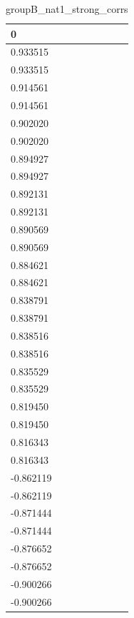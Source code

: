 \begin{table}
\caption{groupB_nat1_strong_corrs}
\label{tab:groupB_nat1_strong_corrs}
\begin{tabular}{lcr}
\toprule
0 \\
\midrule
0.933515 \\
0.933515 \\
0.914561 \\
0.914561 \\
0.902020 \\
0.902020 \\
0.894927 \\
0.894927 \\
0.892131 \\
0.892131 \\
0.890569 \\
0.890569 \\
0.884621 \\
0.884621 \\
0.838791 \\
0.838791 \\
0.838516 \\
0.838516 \\
0.835529 \\
0.835529 \\
0.819450 \\
0.819450 \\
0.816343 \\
0.816343 \\
-0.862119 \\
-0.862119 \\
-0.871444 \\
-0.871444 \\
-0.876652 \\
-0.876652 \\
-0.900266 \\
-0.900266 \\
\bottomrule
\end{tabular}
\end{table}
